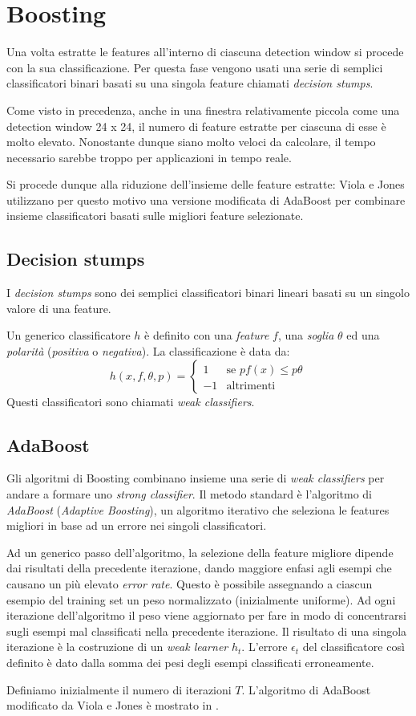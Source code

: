 \section{Boosting}
Una volta estratte le features all'interno di ciascuna detection window si procede con la sua classificazione. Per questa fase vengono usati una serie di semplici classificatori binari basati su una singola feature chiamati \emph{decision stumps}. 

Come visto in precedenza, anche in una finestra relativamente piccola come una detection window 24 x 24, il numero di feature estratte per ciascuna di esse è molto elevato. Nonostante dunque siano molto veloci da calcolare, il tempo necessario sarebbe troppo per applicazioni in tempo reale. 

Si procede dunque alla riduzione dell'insieme delle feature estratte: Viola e Jones utilizzano per questo motivo una versione modificata di AdaBoost per combinare insieme classificatori basati sulle migliori feature selezionate.

\subsection{Decision stumps}

I \emph{decision stumps} sono dei semplici classificatori binari lineari basati su un singolo valore di una feature. 

Un generico classificatore $h$ è definito con una \emph{feature} $f$, una \emph{soglia} $\theta$ ed una \emph{polarità} (\emph{positiva} o  \emph{negativa}). La classificazione è data da:
$$
h(x, f, \theta, p) =
\left\{
\begin{array}{ll}
1 & \mbox{se } p f(x) \leq p \theta \\
-1 & \mbox{altrimenti}
\end{array}
\right.
$$
Questi classificatori sono chiamati \emph{weak classifiers}.

\subsection{AdaBoost}

Gli algoritmi di Boosting combinano insieme una serie di \emph{weak classifiers} per andare a formare uno \emph{strong classifier}. Il metodo standard è l'algoritmo di \emph{AdaBoost} (\emph{Adaptive Boosting}), un algoritmo iterativo che seleziona le features migliori in base ad un errore nei singoli classificatori.

Ad un generico passo dell'algoritmo, la selezione della feature migliore dipende dai risultati della precedente iterazione, dando maggiore enfasi agli esempi che causano un più elevato \emph{error rate}.
Questo è possibile assegnando a ciascun esempio del training set un peso normalizzato (inizialmente uniforme). Ad ogni iterazione dell'algoritmo il peso viene aggiornato per fare in modo di concentrarsi sugli esempi mal classificati nella precedente iterazione. Il risultato di una singola iterazione è la costruzione di un \emph{weak learner} $h_t$. L'errore $\epsilon_t$ del classificatore così definito è dato dalla somma dei pesi degli esempi classificati erroneamente.

Definiamo inizialmente il numero di iterazioni $T$. L'algoritmo di AdaBoost modificato da Viola e Jones è mostrato in .
